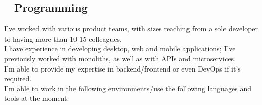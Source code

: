 \documentclass{modernsimplecv}
\newlength{\rightcolwidth}
\begin{document}
\begin{paracol}{2}
\begin{minipage}[t]{\rightcolwidth}
            \section{\faCode~ Programming} 
            {
                \small
                I've worked with various product teams, with sizes reaching from a sole developer to having more than 10-15 colleagues.\\
                
                I have experience in developing desktop, web and mobile applications; I've previously worked with monoliths, as well as with APIs and microservices. \\
                
                I'm able to provide my expertise in backend/frontend or even DevOps if it's required. \\
                
                I'm able to work in the following environments/use the following languages and tools at the moment:
            }
        \end{minipage}\\
    
        \hspace{2em}
    
        \begin{skillsection}{\rightcolwidth}
             \\
             \\
             \\
             \\
             \\
             \\
             \\
             \\
             \\
             \\
        \end{skillsection}
    
        \vspace{2em}
        \bigskip
    
    \end{paracol}
\end{document}
